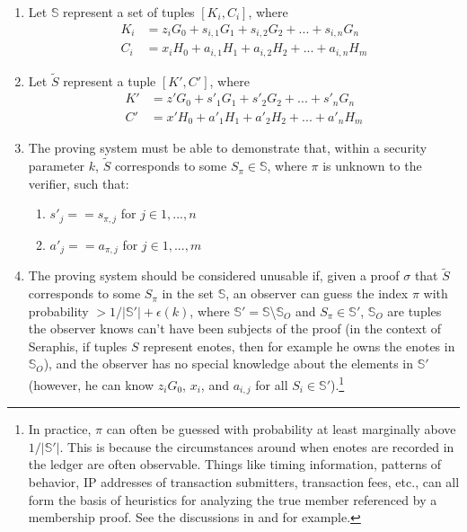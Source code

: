 \begin{enumerate}
    \item Let $\mathbb{S}$ represent a set of tuples $[K_i, C_i]$, where\vspace{.115cm}
    \begin{align*}
        K_i &= z_i G_0 + s_{i,1} G_1 + s_{i,2} G_2 + ... + s_{i,n} G_n \\
        C_i &= x_i H_0 + a_{i,1} H_1 + a_{i,2} H_2 + ... + a_{i,n} H_m
    \end{align*}

    \item Let $\tilde{S}$ represent a tuple $[K', C']$, where\vspace{.115cm}
    \begin{align*}
        K' &= z' G_0 + s'_1 G_1 + s'_2 G_2 + ... + s'_n G_n \\
        C' &= x' H_0 + a'_1 H_1 + a'_2 H_2 + ... + a'_n H_m
    \end{align*}

    \item The proving system must be able to demonstrate that, within a security parameter $k$, $\tilde{S}$ corresponds to some $S_{\pi} \in \mathbb{S}$, where $\pi$ is unknown to the verifier, such that:
    \begin{enumerate}
        \item $s'_j == s_{\pi,j}$ for $j \in 1,...,n$
        \item $a'_j == a_{\pi,j}$ for $j \in 1,...,m$
    \end{enumerate}

    \item The proving system should be considered unusable if, given a proof $\sigma$ that $\tilde{S}$ corresponds to some $S_{\pi}$ in the set $\mathbb{S}$, an observer can guess the index $\pi$ with probability $> 1/|\mathbb{S}'| + \epsilon(k)$, where $\mathbb{S}' = \mathbb{S}$\textbackslash$\mathbb{S}_O$ and $S_{\pi} \in \mathbb{S}'$, $\mathbb{S}_O$ are tuples the observer knows can't have been subjects of the proof (in the context of Seraphis, if tuples $S$ represent enotes, then for example he owns the enotes in $\mathbb{S}_O$), and the observer has no special knowledge about the elements in $\mathbb{S}'$ (however, he can know $z_i G_0$, $x_i$, and $a_{i,j}$ for all $S_i \in \mathbb{S}'$).\footnote{In practice, $\pi$ can often be guessed with probability at least marginally above $1/|\mathbb{S}'|$. This is because the circumstances around when enotes are recorded in the ledger are often observable. Things like timing information, patterns of behavior, IP addresses of transaction submitters, transaction fees, etc., can all form the basis of heuristics for analyzing the true member referenced by a membership proof. See the discussions in \cite{AnalysisOfLinkability} and \cite{foundations-ring-sampling} for example.}
\end{enumerate}

